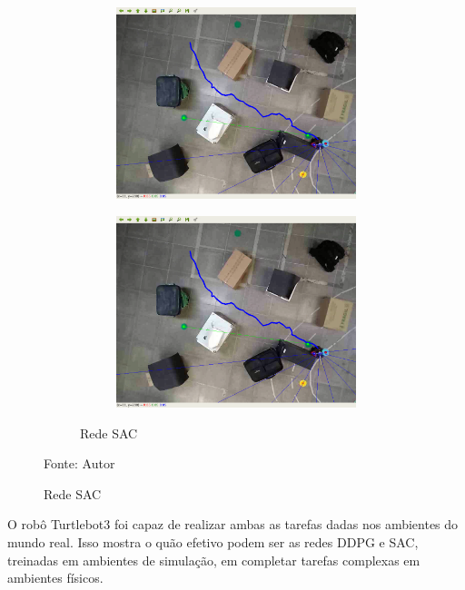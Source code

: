 \begin{figure}[H]
\begin{center}
\begin{subfigure}[b]{0.60\textwidth}
\begin{subfigure}[b]{0.24\textwidth}
            \includegraphics[width=\textwidth]{imagens/real_envs/real_env2_sac/7.png}
        \end{subfigure}
        \hfill
        \begin{subfigure}[b]{0.24\textwidth}
            \includegraphics[width=\textwidth]{imagens/real_envs/real_env2_sac/7.png}
        \end{subfigure}
        \caption{Rede SAC}
        \label{subfig:real_env2_sac}
    \end{subfigure}
    \label{fig:real_env2_frames}
    \end{center}
\small{Fonte: Autor}
\end{figure}

O robô Turtlebot3 foi capaz de realizar ambas as tarefas dadas nos ambientes do mundo real.
Isso mostra o quão efetivo podem ser as redes DDPG e SAC, treinadas em ambientes de simulação, em completar tarefas complexas em ambientes físicos.